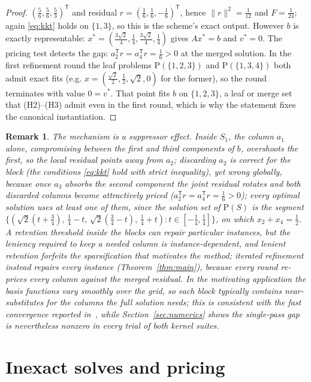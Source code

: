 \documentclass[pdflatex,sn-mathphys-num]{sn-jnl}
\theoremstyle{thmstyleone}
\theoremstyle{thmstyletwo}
\newtheorem{remark}{Remark}
\newcommand{\T}{{\mathsf T}}
\newcommand{\prob}[1]{\mathrm{P}(#1)}
\begin{document}
\begin{proof}
$(\tfrac56,\tfrac56,\tfrac53)^{\T}$ and residual
$r=(\tfrac16,\tfrac16,-\tfrac16)^{\T}$, hence
$\lVert r\rVert^2=\tfrac1{12}$ and $F=\tfrac1{24}$; again
\eqref{eq:kkt} holds on $\{1,3\}$, so this is the scheme's exact output.
However $b$ is exactly representable:
$x^*=(\tfrac{3\sqrt2}{4},\tfrac14,\tfrac{3\sqrt2}{4},\tfrac14)$ gives
$Ax^*=b$ and $v^*=0$. The pricing test detects the gap:
$a_2^{\T}r=a_4^{\T}r=\tfrac16>0$ at the merged solution. In the first
refinement round the leaf problems $\prob{\{1,2,3\}}$ and
$\prob{\{1,3,4\}}$ both admit exact fits (e.g.
$x=(\tfrac{\sqrt2}{2},\tfrac12,\sqrt2,0)$ for the former), so the round
terminates with value $0=v^*$. That point fits $b$ on $\{1,2,3\}$, a
leaf or merge set that (H2)--(H3) admit even in the first round, which
is why the statement fixes the canonical instantiation.
\end{proof}

\begin{remark}\label{rem:mechanism}
The mechanism is a suppressor effect. Inside $S_1$, the column $a_1$
alone, compromising between the first and third components of $b$,
overshoots the first, so the local residual points away from $a_2$; discarding $a_2$ is \emph{correct for
the block} (the conditions \eqref{eq:kkt} hold with strict inequality),
yet wrong globally, because once $a_3$ absorbs the second component
the joint residual rotates and both discarded columns become
attractively priced ($a_2^{\T}r=a_4^{\T}r=\tfrac16>0$); every optimal
solution uses at least one of them, since the solution set of
$\prob{S}$ is the segment
$\{(\sqrt2(t+\tfrac34),\,\tfrac14-t,\,\sqrt2(\tfrac34-t),\,
\tfrac14+t):t\in[-\tfrac14,\tfrac14]\}$, on which
$x_2+x_4=\tfrac12$. A retention threshold inside the blocks can repair
particular instances, but the leniency required to keep a needed
column is instance-dependent, and lenient retention forfeits the
sparsification that motivates the method; iterated refinement instead
repairs every instance (Theorem~\ref{thm:main}), because every round
re-prices every column against the merged residual. In the
motivating application the basis functions vary smoothly over the
grid, so each block typically contains near-substitutes for the
columns the full solution needs; this is consistent with the fast
convergence reported in~\cite{brookes2006}, while
Section~\ref{sec:numerics} shows the single-pass gap is nevertheless
nonzero in every trial of both kernel suites.
\end{remark}

\section{Inexact solves and pricing}\label{sec:inexact}
\end{document}
